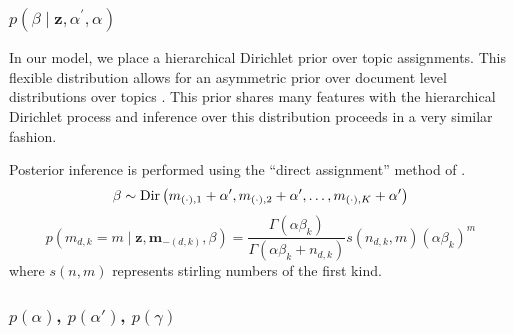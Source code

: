 \documentclass{article}
\begin{document}



\subsubsection{$p\left(\beta\mid\mathbf{z},\alpha^{\prime},\alpha\right)$}

In our model, we place a hierarchical Dirichlet prior over topic assignments.
This flexible distribution allows for an asymmetric prior over document
level distributions over topics \citep{WallachMiMc2009}. This prior
shares many features with the hierarchical Dirichlet process and inference
over this distribution proceeds in a very similar fashion.

Posterior inference is performed using the {}``direct assignment''
method of \citet{TehJorBea2006}. \begin{equation}
\beta\sim{\rm Dir}\left(m_{\left(\cdot\right),1}+\alpha^{\prime},m_{\left(\cdot\right),2}+\alpha^{\prime},\ldots,m_{\left(\cdot\right),K}+\alpha^{\prime}\right)\end{equation}
 \begin{equation}
p\left(m_{d,k}=m\mid\mathbf{z},\mathbf{m}_{-\left(d,k\right)},\beta\right)=\frac{\Gamma\left(\alpha\beta_{k}\right)}{\Gamma\left(\alpha\beta_{k}+n_{d,k}\right)}s\left(n_{d,k},m\right)\left(\alpha\beta_{k}\right)^{m}\end{equation}
 where $s\left(n,m\right)$ represents stirling numbers of the first
kind. 


\subsubsection{$p\left(\alpha\right)$, $p\left(\alpha'\right)$, $p\left(\gamma\right)$}
\end{document}
